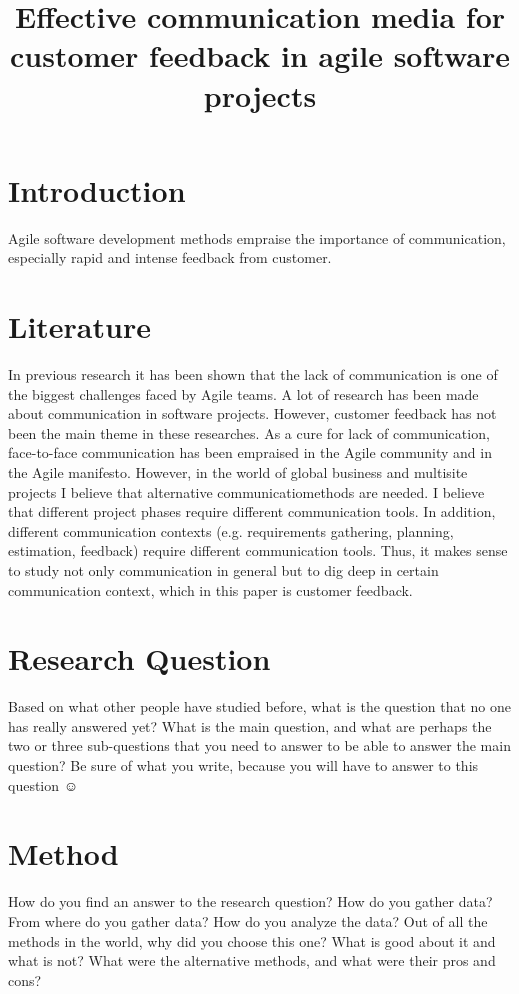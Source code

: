 \documentclass[a4paper]{article}
\begin{document}
\title{\huge Effective communication media for customer feedback in agile software projects}
\date{\vspace{-5ex}}
\maketitle

\section{Introduction}
Agile software development methods empraise the importance of communication, especially rapid and intense feedback from customer.

\section{Literature}
In previous research it has been shown that the lack of communication is one of the biggest challenges faced by Agile teams. A lot of research has been made about communication in software projects. However, customer feedback has not been the main theme in these researches.
As a cure for lack of communication, face-to-face communication has been empraised in the Agile community and in the Agile manifesto. However, in the world of global business and multisite projects I believe that alternative communicatiomethods are needed.
I believe that different project phases require different communication tools. In addition, different communication contexts (e.g. requirements gathering, planning, estimation, feedback) require different communication tools. Thus, it makes sense to study not only communication in general but to dig deep in certain communication context, which in this paper is customer feedback.

\section{Research Question}

Based on what other people have studied before, what is the question that no one has really answered yet? What is the main question, and what are perhaps the two or three sub-questions that you need to answer to be able to answer the main question? Be sure of what you write, because you will have to answer to this question ☺

\section{Method}
How do you find an answer to the research question? How do you gather data? From where do you gather data? How do you analyze the data? Out of all the methods in the world, why did you choose this one? What is good about it and what is not? What were the alternative methods, and what were their pros and cons? 
\end{document}

